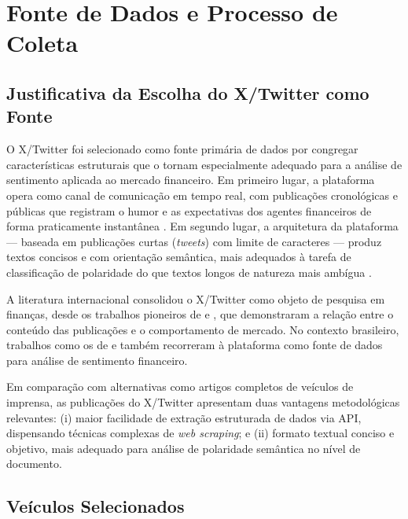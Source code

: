 
\section{Fonte de Dados e Processo de Coleta}
\label{sec:fonte_dados}

\subsection{Justificativa da Escolha do X/Twitter como Fonte}
\label{subsec:justificativa_twitter}

O X/Twitter foi selecionado como fonte primária de dados por congregar características estruturais que o tornam especialmente adequado para a análise de sentimento aplicada ao mercado financeiro. Em primeiro lugar, a plataforma opera como canal de comunicação em tempo real, com publicações cronológicas e públicas que registram o humor e as expectativas dos agentes financeiros de forma praticamente instantânea \cite{bollen2011}. Em segundo lugar, a arquitetura da plataforma — baseada em publicações curtas (\textit{tweets}) com limite de caracteres — produz textos concisos e com
orientação semântica, mais adequados à tarefa de classificação de polaridade do que textos longos de natureza mais ambígua \cite{ranco2015}.

A literatura internacional consolidou o X/Twitter como objeto de pesquisa em finanças, desde os trabalhos pioneiros de  e , que demonstraram a relação entre o conteúdo das publicações e o comportamento de mercado. No contexto brasileiro, trabalhos como os de  e  também recorreram à plataforma como fonte de dados para análise de sentimento financeiro.

Em comparação com alternativas como artigos completos de veículos de imprensa, as publicações do X/Twitter apresentam duas vantagens metodológicas relevantes: (i) maior facilidade de extração estruturada de dados via API, dispensando técnicas complexas de \textit{web scraping}; e (ii) formato textual conciso e objetivo, mais adequado para análise de polaridade semântica no nível de documento.

\subsection{Veículos Selecionados}
\label{subsec:veiculos}

